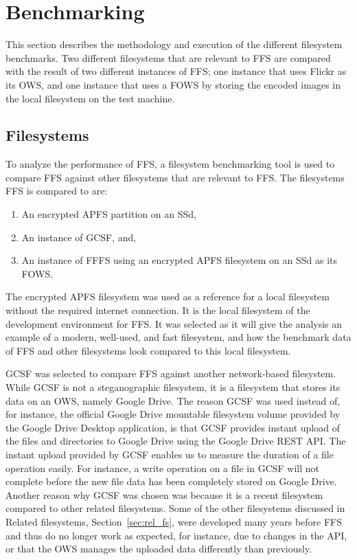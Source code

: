 \section{Benchmarking}
This section describes the methodology and execution of the different filesystem benchmarks. Two different filesystems that are relevant to \gls{FFS} are compared with the result of two different instances of \gls{FFS}; one instance that uses Flickr as its \gls{OWS}, and one instance that uses a \gls{FOWS} by storing the encoded images in the local filesystem on the test machine.

\subsection{Filesystems}
To analyze the performance of \gls{FFS}, a filesystem benchmarking tool is used to compare \gls{FFS} against other filesystems that are relevant to \gls{FFS}. The filesystems \gls{FFS} is compared to are:
\begin{enumerate}
	\item An encrypted \gls{APFS} partition on an SSd,
	\item An instance of \gls{GCSF}, and,
	\item An instance of \gls{FFFS} using an encrypted \gls{APFS} filesystem on an SSd as its \gls{FOWS}.
\end{enumerate}
The encrypted \gls{APFS} filesystem was used as a reference for a local filesystem without the required internet connection. It is the local filesystem of the development environment for \gls{FFS}. It was selected as it will give the analysis an example of a modern, well-used, and fast filesystem, and how the benchmark data of \gls{FFS} and other filesystems look compared to this local filesystem.

GCSF was selected to compare \gls{FFS} against another network-based filesystem. While \gls{GCSF} is not a steganographic filesystem, it is a filesystem that stores its data on an \gls{OWS}, namely Google Drive. The reason \gls{GCSF} was used instead of, for instance, the official Google Drive mountable filesystem volume provided by the Google Drive Desktop application, is that \gls{GCSF} provides instant upload of the files and directories to Google Drive using the Google Drive REST API. The instant upload provided by \gls{GCSF} enables us to measure the duration of a file operation easily. For instance, a write operation on a file in \gls{GCSF} will not complete before the new file data has been completely stored on Google Drive. Another reason why \gls{GCSF} was chosen was because it is a recent filesystem compared to other related filesystems. Some of the other filesystems discussed in Related filesystems, Section~\ref{sec:rel_fs}, were developed many years before \gls{FFS} and thus do no longer work as expected, for instance, due to changes in the API, or that the \gls{OWS} manages the uploaded data differently than previously.

